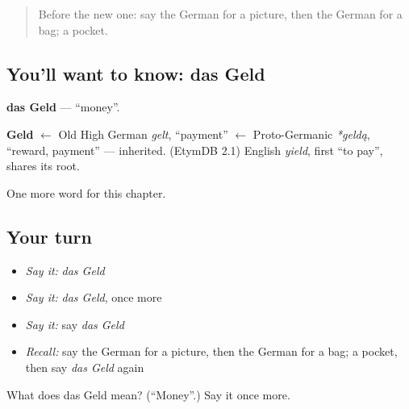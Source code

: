 \begin{quote}
Before the new one: say the German for a picture, then the German for a bag; a pocket.
\end{quote}

\subsection*{You'll want to know: das Geld}
\textbf{das Geld} — \textquotedblleft{}money\textquotedblright{}.

\begin{cousinweb}
\textbf{Geld} $\leftarrow$ Old High German \emph{gelt}, \textquotedblleft{}payment\textquotedblright{} $\leftarrow$ Proto-Germanic \emph{*geldą}, \textquotedblleft{}reward, payment\textquotedblright{} — inherited. (EtymDB 2.1) English \emph{yield}, first \textquotedblleft{}to pay\textquotedblright{}, shares its root.
\end{cousinweb}

\begin{grammarlens}[title={What you've built}]
One more word for this chapter.
\end{grammarlens}

\subsection*{Your turn}
\begin{itemize}
\raggedright
  \item \emph{Say it:} \emph{das Geld}
  \item \emph{Say it:} \emph{das Geld}, once more
  \item \emph{Say it:} say \emph{das Geld}
  \item \emph{Recall:} say the German for a picture, then the German for a bag; a pocket, then say \emph{das Geld} again
\end{itemize}

\begin{tcolorbox}[breakable,colback=teal!4,colframe=teal!35!black,title={Before you move on}]
What does das Geld mean? (\textquotedblleft{}Money\textquotedblright{}.) Say it once more.
\end{tcolorbox}
